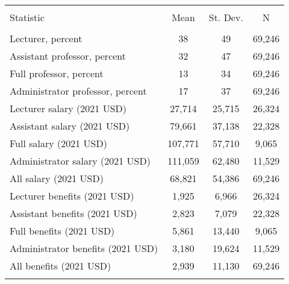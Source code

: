 
\begin{tabular}{@{\extracolsep{5pt}}lccc} 
\\[-1.8ex]\hline 
\hline \\[-1.8ex] 
Statistic & \multicolumn{1}{c}{Mean} & \multicolumn{1}{c}{St. Dev.} & \multicolumn{1}{c}{N} \\ 
\hline \\[-1.8ex] 
Lecturer, percent & 38 & 49 & 69,246 \\ 
Assistant professor, percent & 32 & 47 & 69,246 \\ 
Full professor, percent & 13 & 34 & 69,246 \\ 
Administrator professor, percent & 17 & 37 & 69,246 \\ 
Lecturer salary (2021 USD) & 27,714 & 25,715 & 26,324 \\ 
Assistant salary (2021 USD) & 79,661 & 37,138 & 22,328 \\ 
Full salary (2021 USD) & 107,771 & 57,710 & 9,065 \\ 
Administrator salary (2021 USD) & 111,059 & 62,480 & 11,529 \\ 
All salary (2021 USD) & 68,821 & 54,386 & 69,246 \\ 
Lecturer benefits (2021 USD) & 1,925 & 6,966 & 26,324 \\ 
Assistant benefits (2021 USD) & 2,823 & 7,079 & 22,328 \\ 
Full benefits (2021 USD) & 5,861 & 13,440 & 9,065 \\ 
Administrator benefits (2021 USD) & 3,180 & 19,624 & 11,529 \\ 
All benefits (2021 USD) & 2,939 & 11,130 & 69,246 \\ 
\hline \\[-1.8ex] 
\end{tabular} 
